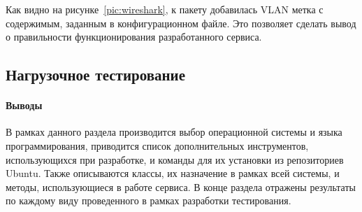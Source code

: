 Как видно на рисунке~\ref{pic:wireshark}, к пакету добавилась VLAN метка с содержимым, заданным в конфигурационном файле. Это позволяет сделать вывод о правильности функционирования разработанного сервиса.

\subsection{Нагрузочное тестирование}

\paragraph{Выводы}

В рамках данного раздела производится выбор операционной системы и языка программирования, приводится список дополнительных инструментов, использующихся при разработке, и команды для их установки из репозиториев Ubuntu. Также описываются классы, их назначение в рамках всей системы, и методы, использующиеся в работе сервиса. В конце раздела отражены результаты по каждому виду проведенного в рамках разработки тестирования.
